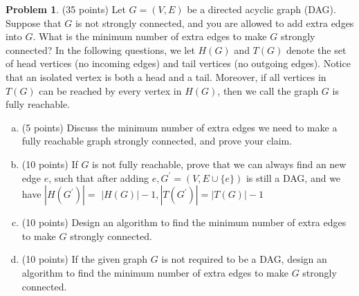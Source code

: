 \documentclass{article}
\theoremstyle{definition}
\newtheorem{prob}{Problem}
\begin{document}
\begin{prob}
	(35 points) Let $G=(V, E)$ be a directed acyclic graph (DAG). Suppose that $G$ is not strongly connected, and you are allowed to add extra edges into $G$. What is the minimum number of extra edges to make $G$ strongly connected? In the following questions, we let $H(G)$ and $T(G)$ denote the set of head vertices (no incoming edges) and tail vertices (no outgoing edges). Notice that an isolated vertex is both a head and a tail. Moreover, if all vertices in $T(G)$ can be reached by every vertex in $H(G)$, then we call the graph $G$ is fully reachable.
	\begin{enumerate}[(a)]
	\item(5 points) Discuss the minimum number of extra edges we need to make a fully reachable graph strongly connected, and prove your claim.
	\item(10 points) If $G$ is not fully reachable, prove that we can always find an new edge $e$, such that after adding $e, G^{\prime}=(V, E \cup\{e\})$ is still a DAG, and we have $\left|H\left(G^{\prime}\right)\right|=$ $|H(G)|-1,\left|T\left(G^{\prime}\right)\right|=|T(G)|-1$
	\item(10 points) Design an algorithm to find the minimum number of extra edges to make $G$ strongly connected.
	\item(10 points) If the given graph $G$ is not required to be a DAG, design an algorithm to find the minimum number of extra edges to make $G$ strongly connected.
	\end{enumerate}
\end{prob}
\end{document}
